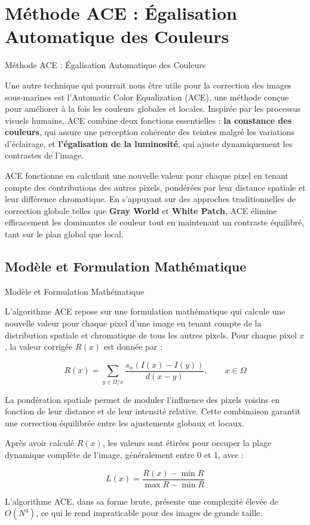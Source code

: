 \documentclass[8pt,a4paper]{beamer}
\numberwithin{figure}{section}
\begin{document}
\section{Méthode ACE : Égalisation Automatique des Couleurs}
\frame{\tableofcontents[currentsection]}
\begin{frame}{Méthode ACE : Égalisation Automatique des Couleurs}
\par Une autre technique qui pourrait nous être utile pour la correction des images sous-marines est l'Automatic Color Equalization (ACE), une méthode conçue pour améliorer à la fois les couleurs globales et locales. Inspirée par les processus visuels humains, ACE combine deux fonctions essentielles : \textbf{la constance des couleurs}, qui assure une perception cohérente des teintes malgré les variations d'éclairage, et \textbf{l'égalisation de la luminosité}, qui ajuste dynamiquement les contrastes de l'image.
\vspace{2mm}
\par ACE fonctionne en calculant une nouvelle valeur pour chaque pixel en tenant compte des contributions des autres pixels, pondérées par leur distance spatiale et leur différence chromatique. En s'appuyant sur des approches traditionnelles de correction globale telles que \textbf{Gray World} et \textbf{White Patch}, ACE élimine efficacement les dominantes de couleur tout en maintenant un contraste équilibré, tant sur le plan global que local.
\end{frame}

\subsection{Modèle et Formulation Mathématique}
\begin{frame}{Modèle et Formulation Mathématique}
\par L'algorithme ACE repose sur une formulation mathématique qui calcule une nouvelle valeur pour chaque pixel d'une image en tenant compte de la distribution spatiale et chromatique de tous les autres pixels. Pour chaque pixel \( x \), la valeur corrigée \( R(x) \) est donnée par :

$$
R(x) = \displaystyle\sum_{y \in \Omega / x}\dfrac{ s_\alpha(I(x) - I(y))}{d(x-y)}, \quad\quad x\in \Omega
$$

\par La pondération spatiale permet de moduler l'influence des pixels voisins en fonction de leur distance et de leur intensité relative. Cette combinaison garantit une correction équilibrée entre les ajustements globaux et locaux.
\vspace{2mm}
\par Après avoir calculé \( R(x) \), les valeurs sont étirées pour occuper la plage dynamique complète de l'image, généralement entre 0 et 1, avec :

$$
L(x) = \frac{R(x) - \min R}{\max R - \min R}
$$
\par L'algorithme ACE, dans sa forme brute, présente une complexité élevée de \( O(N^4) \), ce qui le rend impraticable pour des images de grande taille.
\end{frame}
\end{document}
